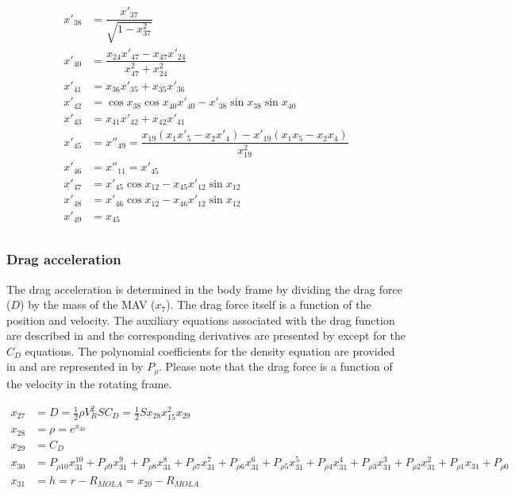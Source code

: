 \begin{align}
\begin{split}
x'_{38} &= \dfrac{x'_{37}}{\sqrt{1-x_{37}^{2}}} \\ 
x'_{40} &=  \dfrac{x_{24}x'_{47}-x_{47}x'_{24}}{x_{47}^{2}+x_{24}^{2}}\\
x'_{41} &= x_{36}x'_{35}+x_{35}x'_{36}\\ 
x'_{42} &= \cos x_{38} \cos x_{40} x'_{40}-x'_{38} \sin x_{38} \sin x_{40}\\
x'_{43} &= x_{41}x'_{42}+x_{42}x'_{41} \\ 
x'_{45} &= x''_{49} = \dfrac{x_{19}\left(x_{1}x'_{5}-x_{2}x'_{4}\right)-x'_{19}\left(x_{1}x_{5}-x_{2}x_{4}\right)}{x_{19}^{2}}\\
x'_{46} &= x''_{11} = x'_{45} \\
x'_{47} &= x'_{45}\cos x_{12} - x_{45}x'_{12}\sin x_{12} \\
x'_{48} &= x'_{46}\cos x_{12} - x_{46}x'_{12}\sin x_{12} \\
x'_{49} &= x_{45}\\
\end{split}
\end{align}

 \subsubsection{Drag acceleration}
 \label{subsubsec:tsiDrag}
The drag acceleration is determined in the body frame by dividing the drag force ($D$) by the mass of the \ac{MAV} ($x_{7}$). The drag force itself is a function of the position and velocity. The auxiliary equations associated with the drag function are described in  and the corresponding derivatives are presented by  except for the $C_{D}$ equations. The polynomial coefficients for the density equation are provided in  and are represented in  by $P_{\rho}$. Please note that the drag force is a function of the velocity in the rotating frame.

 \begin{equation} \label{eq:dragAux}
\begin{split}
x_{27} &= D = \frac{1}{2}\rho V_{R}^{2}SC_{D} = \frac{1}{2}S x_{28}x_{15}^{2}x_{29} \\
x_{28} &= \rho = e^{x_{30}} \\
x_{29} &= C_{D} \\
x_{30} &= P_{\rho 10}x_{31}^{10}+P_{\rho 9}x_{31}^{9}+P_{\rho 8}x_{31}^{8}+P_{\rho 7}x_{31}^{7}+P_{\rho 6}x_{31}^{6}+P_{\rho 5}x_{31}^{5}+P_{\rho 4}x_{31}^{4}+P_{\rho 3}x_{31}^{3}+P_{\rho 2}x_{31}^{2}+P_{\rho 1}x_{31}+P_{\rho 0} \\
x_{31} &= h = r-R_{MOLA} = x_{20}-R_{MOLA}
\end{split}
\end{equation}

